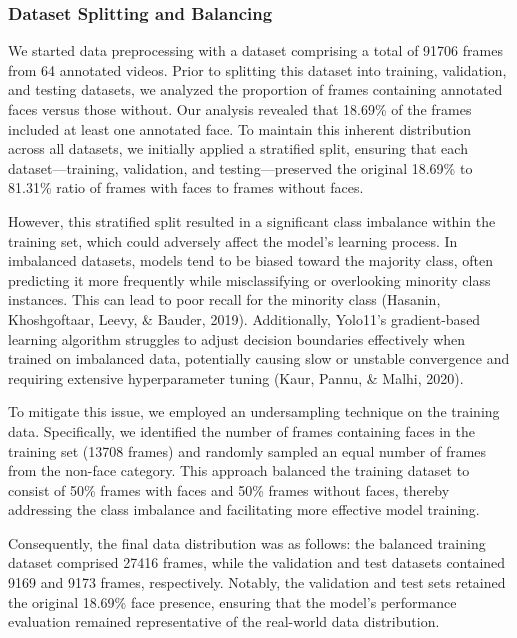 \documentclass[
  man,floatsintext]{apa6}
\begin{document}
\subsubsection{Dataset Splitting and Balancing}\label{dataset-splitting-and-balancing-1}

We started data preprocessing with a dataset comprising a total of 91706 frames from 64 annotated videos. Prior to splitting this dataset into training, validation, and testing datasets, we analyzed the proportion of frames containing annotated faces versus those without. Our analysis revealed that 18.69\% of the frames included at least one annotated face. To maintain this inherent distribution across all datasets, we initially applied a stratified split, ensuring that each dataset---training, validation, and testing---preserved the original
18.69\% to 81.31\% ratio of frames with faces to frames without faces.

However, this stratified split resulted in a significant class imbalance within the training set, which could adversely affect the model's learning process. In imbalanced datasets, models tend to be biased toward the majority class, often predicting it more frequently while misclassifying or overlooking minority class instances. This can lead to poor recall for the minority class (Hasanin, Khoshgoftaar, Leevy, \& Bauder, 2019). Additionally, Yolo11's gradient-based learning algorithm struggles to adjust decision boundaries effectively when trained on imbalanced data, potentially causing slow or unstable convergence and requiring extensive hyperparameter tuning (Kaur, Pannu, \& Malhi, 2020).

To mitigate this issue, we employed an undersampling technique on the training data. Specifically, we identified the number of frames containing faces in the training set (13708 frames) and randomly sampled an equal number of frames from the non-face category. This approach balanced the training dataset to consist of 50\% frames with faces and 50\% frames without faces, thereby addressing the class imbalance and facilitating more effective model training.

Consequently, the final data distribution was as follows: the balanced training dataset comprised 27416 frames, while the validation and test datasets contained 9169 and 9173 frames, respectively. Notably, the validation and test sets retained the original 18.69\% face presence, ensuring that the model's performance evaluation remained representative of the real-world data distribution.
\end{document}
